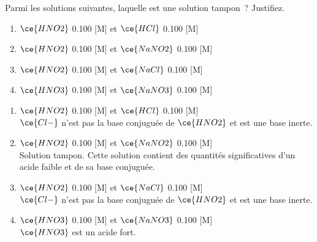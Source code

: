 \documentclass[
  11pt,
  a4paper,
  openany]{book}
\providecommand{\tightlist}{%
  \setlength{\itemsep}{0pt}\setlength{\parskip}{0pt}}
\begin{document}
\begin{Exercise}

Parmi les solutions suivantes, laquelle est une solution tampon~? Justifiez.

\begin{enumerate}
\def\labelenumi{\alph{enumi}.}
\tightlist
\item
  \(\ce{HNO2}\) 0.100 {[}M{]} et \(\ce{HCl}\) 0.100 {[}M{]}
\item
  \(\ce{HNO2}\) 0.100 {[}M{]} et \(\ce{NaNO2}\) 0.100 {[}M{]}
\item
  \(\ce{HNO2}\) 0.100 {[}M{]} et \(\ce{NaCl}\) 0.100 {[}M{]}
\item
  \(\ce{HNO3}\) 0.100 {[}M{]} et \(\ce{NaNO3}\) 0.100 {[}M{]}
\end{enumerate}

\end{Exercise}

\begin{Answer}

\begin{enumerate}
\def\labelenumi{\alph{enumi}.}
\tightlist
\item
  \(\ce{HNO2}\) 0.100 {[}M{]} et \(\ce{HCl}\) 0.100 {[}M{]}\\
  \(\ce{Cl-}\) n'est pas la base conjuguée de \(\ce{HNO2}\) et est une base inerte.
  \vspace{1em}
\item
  \(\ce{HNO2}\) 0.100 {[}M{]} et \(\ce{NaNO2}\) 0.100 {[}M{]}\\
  Solution tampon. Cette solution contient des quantités significatives d'un acide faible et de sa base conjuguée.
  \vspace{1em}
\item
  \(\ce{HNO2}\) 0.100 {[}M{]} et \(\ce{NaCl}\) 0.100 {[}M{]}\\
  \(\ce{Cl-}\) n'est pas la base conjuguée de \(\ce{HNO2}\) et est une base inerte.
  \vspace{1em}
\item
  \(\ce{HNO3}\) 0.100 {[}M{]} et \(\ce{NaNO3}\) 0.100 {[}M{]}\\
  \(\ce{HNO3}\) est un acide fort.
  \clearpage
\end{enumerate}

\end{Answer}
\end{document}
